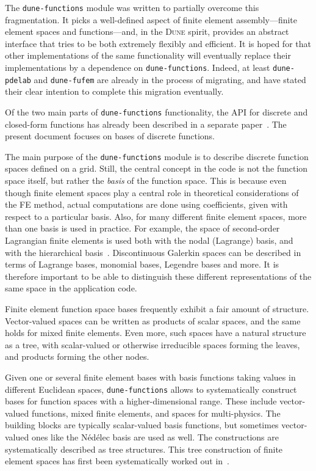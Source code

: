 \documentclass[a4paper,10pt,headings=normal,bibliography=totoc]{scrartcl}
\newcommand{\dune}{\textsc{Dune}\xspace}
\newcommand{\dunemodule}[1]{\texttt{#1}}
\begin{document}
The \dunemodule{dune-functions}  module was written to partially overcome this fragmentation.
It picks a well-defined aspect of finite element assembly---finite element spaces and functions---and,
in the \dune spirit, provides an abstract interface that tries to be both extremely flexibly
and efficient.  It is hoped for that other implementations of the same functionality will
eventually replace their implementations by a dependence on \dunemodule{dune-functions}.
Indeed, at least \dunemodule{dune-pdelab} and \dunemodule{dune-fufem} are already in the process
of migrating, and have stated their clear intention to complete this migration eventually.

Of the two main parts of \dunemodule{dune-functions} functionality, the API for discrete and
closed-form functions has already been described in a separate paper~\cite{engwer_graeser_muething_sander:2015}.
The present document focuses on bases of discrete functions.

The main purpose of the \dunemodule{dune-functions} module is to describe discrete function spaces defined on a grid.
Still, the central concept in the code is not the function space itself, but rather the {\em basis} of the function space.
This is because even though finite element spaces play a central role in theoretical considerations of the FE method,
actual computations are done using coefficients, given with respect to a particular basis.  Also,
for many different finite element spaces, more than one basis is used in practice.  For example,
the space of second-order Lagrangian finite elements is used both with the nodal (Lagrange) basis, and with the
hierarchical basis~\cite{bank:1996}.  Discontinuous Galerkin spaces can be described in terms of Lagrange bases,
monomial bases, Legendre bases and more.  It is therefore important to be able to distinguish these different
representations of the same space in the application code.

Finite element function space bases frequently exhibit a fair amount of structure.  Vector-valued spaces can be
written as products of scalar spaces, and the same holds for mixed finite elements.  Even more, such spaces
have a natural structure as a tree, with scalar-valued or otherwise irreducible spaces forming the leaves, and
products forming the other nodes.

Given one or several finite element bases with basis functions taking values in different Euclidean spaces,
\dunemodule{dune-functions} allows to systematically construct bases for function spaces with a
higher-dimensional range.  These include vector-valued functions, mixed finite elements, and spaces
for multi-physics.  The building blocks are typically scalar-valued basis functions, but sometimes vector-valued
ones like the N\'ed\'elec basis are used as well. The constructions are systematically described as tree structures.
This tree construction of finite element spaces has first been systematically worked out in~\cite{muething:2015}.
\end{document}
